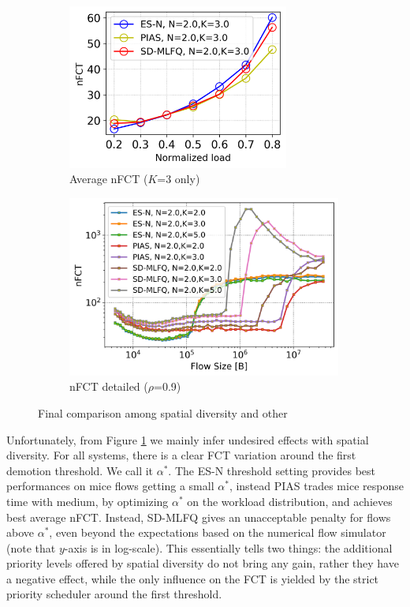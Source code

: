 \begin{figure}
	\centering
	\begin{subfigure}{.5\textwidth}
		\centering
		\includegraphics[width=0.8\textwidth]{Chapter4/Figures/sd-final-comparison-fct-vs-load}
		\caption{Average nFCT ($K$=3 only)}
		\label{fig:sd-final}
	\end{subfigure}%
	\hfill
	\begin{subfigure}{.5\textwidth}
		\centering
		\includegraphics[width=0.99\textwidth]{Chapter4/Figures/sd-final-comparison}
		\caption{nFCT detailed ($\rho$=0.9)}
		\label{fig:sd-final-detailed}
	\end{subfigure}%
	\caption{Final comparison among spatial diversity and other}
	\label{fig:sd-defeat}
\end{figure}%
Unfortunately, from Figure \ref{fig:sd-final} we mainly infer undesired effects with spatial diversity. For all systems, there is a clear FCT variation around the first demotion threshold. We call it $\alpha^{*}$. The ES-N threshold setting  provides best performances on mice flows getting a small $\alpha^{*}$, instead PIAS trades mice response time with medium, by optimizing $\alpha^*$ on the workload distribution, and achieves best average nFCT. Instead, SD-MLFQ gives an unacceptable penalty for flows above $\alpha^*$, even beyond the expectations based on the numerical flow simulator (note that $y$-axis is in log-scale). This essentially tells two things: the additional priority levels offered by spatial diversity do not bring any gain, rather they have a negative effect, while the only influence on the FCT is yielded by the strict priority scheduler around the first threshold. 
